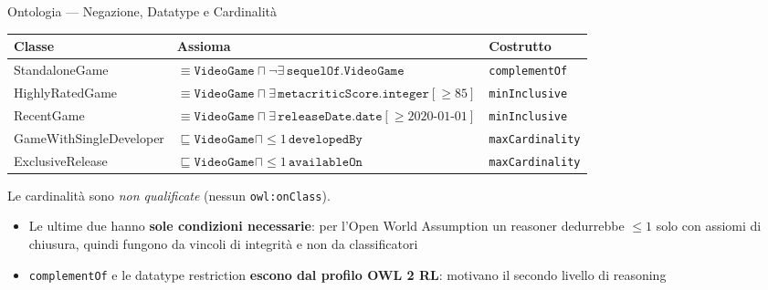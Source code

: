 \documentclass[aspectratio=169,11pt]{beamer}
\begin{document}
\begin{frame}{Ontologia --- Negazione, Datatype e Cardinalit\`a}
  \footnotesize
  \begin{tabular}{@{}l l l@{}}
    \toprule
    \textbf{Classe} & \textbf{Assioma} & \textbf{Costrutto} \\
    \midrule
    StandaloneGame  & $\equiv \texttt{VideoGame} \sqcap \lnot\exists\,\texttt{sequelOf.VideoGame}$ & \texttt{complementOf} \\
    HighlyRatedGame & $\equiv \texttt{VideoGame} \sqcap \exists\,\texttt{metacriticScore}.\texttt{integer}[\ge 85]$ & \texttt{minInclusive} \\
    RecentGame      & $\equiv \texttt{VideoGame} \sqcap \exists\,\texttt{releaseDate}.\texttt{date}[\ge 2020\text{-}01\text{-}01]$ & \texttt{minInclusive} \\
    \midrule
    GameWithSingleDeveloper & $\sqsubseteq \texttt{VideoGame} \sqcap {\le}1\,\texttt{developedBy}$ & \texttt{maxCardinality} \\
    ExclusiveRelease        & $\sqsubseteq \texttt{VideoGame} \sqcap {\le}1\,\texttt{availableOn}$ & \texttt{maxCardinality} \\
    \bottomrule
  \end{tabular}

  {\scriptsize Le cardinalit\`a sono \emph{non qualificate} (nessun \texttt{owl:onClass}).\par}

  \vspace{6pt}

  \begin{itemize}
    \item Le ultime due hanno \textbf{sole condizioni necessarie}: per l'Open World
      Assumption un reasoner dedurrebbe ${\le}1$ solo con assiomi di chiusura, quindi fungono da
      vincoli di integrit\`a e non da classificatori
    \item \texttt{complementOf} e le datatype restriction \textbf{escono dal profilo OWL 2 RL}:
      motivano il secondo livello di reasoning
  \end{itemize}
\end{frame}
\end{document}
